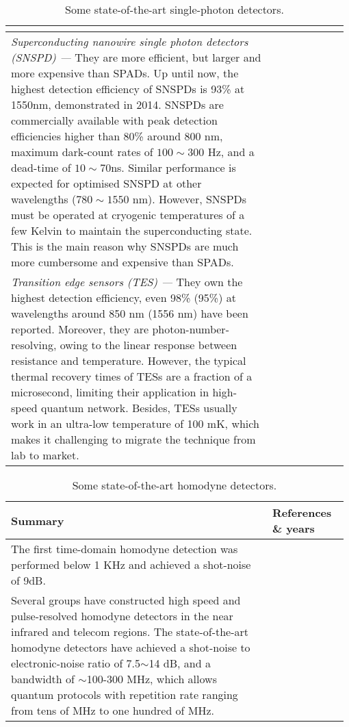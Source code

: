 \begin{table*}[!htbp]
\begin{tabular}{|p{0.755\linewidth}|p{0.22\linewidth}|}
\begin{itemize}
		\end{itemize} &  \cite{bib:shentu2013ultralow} \\
		\hline
		\textit{Superconducting nanowire single photon detectors (SNSPD) ---} 
		They are more efficient, but larger and more expensive than SPADs. Up until now, the highest detection efficiency of SNSPDs is 93\% at 1550nm, demonstrated in 2014. SNSPDs are commercially available with peak detection efficiencies higher than 80\% around 800 nm, maximum dark-count rates of $100\sim 300$ Hz, and a dead-time of $10\sim 70$ns. Similar performance is expected for optimised SNSPD at other wavelengths ($780\sim 1550$ nm). However, SNSPDs must be operated at cryogenic temperatures of a few Kelvin to maintain the superconducting state. This is the main reason why SNSPDs are much more cumbersome and expensive than SPADs. &  \cite{bib:marsili2013} \\
		\hline
		\textit{Transition edge sensors (TES) ---}
		They own the highest detection efficiency, even 98\% (95\%) at wavelengths around 850 nm (1556 nm) have been reported. Moreover, they are photon-number-resolving, owing to the linear response between resistance and temperature. However, the typical thermal recovery times of TESs are a fraction of a microsecond, limiting their application in high-speed quantum network. Besides, TESs usually work in an ultra-low temperature of 100 mK, which makes it challenging to migrate the technique from lab to market. & \cite{bib:fukuda2011, bib:lita2008} \\
		\hline
	\end{tabular}
	\captionspacetab \caption{Some state-of-the-art single-photon detectors.}\label{tab:photodetection}
\end{table*}

\begin{table*}[!htbp]
	\begin{tabular}{|p{0.755\linewidth}|p{0.22\linewidth}|}
		\hline
		Summary & References \& years \\
		\hline \hline
		The first time-domain homodyne detection was performed below 1 KHz and achieved a shot-noise of 9dB. & \cite{bib:Smithey1993} \\
		\hline
		Several groups have constructed high speed and pulse-resolved homodyne detectors in the near infrared and telecom regions. The state-of-the-art homodyne detectors have achieved a shot-noise to electronic-noise ratio of 7.5$\sim$14 dB, and a bandwidth of $\sim$100-300 MHz, which allows quantum protocols with repetition rate ranging from tens of MHz to one hundred of MHz. & \cite{bib:zavatta2002time, bib:okubo2008pulse, bib:kumar2012versatile, bib:chi2011balanced, bib:duan2013} \\
		\hline
	\end{tabular}
	\captionspacetab \caption{Some state-of-the-art homodyne detectors.} \label{tab:homodyning}
\end{table*}

